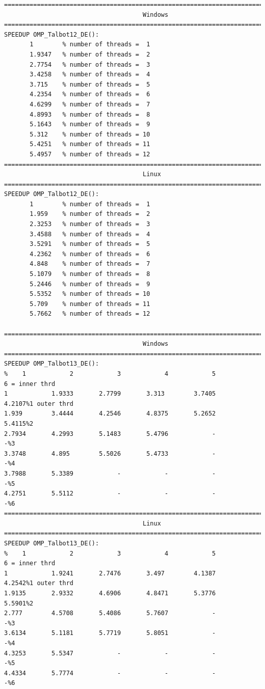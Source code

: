 \documentclass[a4paper,10pt]{report}%
\begin{document}
\begin{lstlisting}
====================================================================================
                                      Windows
====================================================================================
SPEEDUP OMP_Talbot12_DE():
       1        % number of threads =  1
       1.9347   % number of threads =  2
       2.7754   % number of threads =  3
       3.4258   % number of threads =  4
       3.715    % number of threads =  5
       4.2354   % number of threads =  6
       4.6299   % number of threads =  7
       4.8993   % number of threads =  8
       5.1643   % number of threads =  9
       5.312    % number of threads = 10
       5.4251   % number of threads = 11
       5.4957   % number of threads = 12
====================================================================================
                                      Linux
====================================================================================
SPEEDUP OMP_Talbot12_DE():
       1        % number of threads =  1
       1.959    % number of threads =  2
       2.3253   % number of threads =  3
       3.4588   % number of threads =  4
       3.5291   % number of threads =  5
       4.2362   % number of threads =  6
       4.848    % number of threads =  7
       5.1079   % number of threads =  8
       5.2446   % number of threads =  9
       5.5352   % number of threads = 10
       5.709    % number of threads = 11
       5.7662   % number of threads = 12

====================================================================================
                                      Windows
====================================================================================
SPEEDUP OMP_Talbot13_DE():
%    1            2            3            4            5            6 = inner thrd
1            1.9333       2.7799       3.313        3.7405       4.2107%1 outer thrd
1.939        3.4444       4.2546       4.8375       5.2652       5.4115%2
2.7934       4.2993       5.1483       5.4796            -            -%3
3.3748       4.895        5.5026       5.4733            -            -%4
3.7988       5.3389            -            -            -            -%5
4.2751       5.5112            -            -            -            -%6
====================================================================================
                                      Linux
====================================================================================
SPEEDUP OMP_Talbot13_DE():
%    1            2            3            4            5            6 = inner thrd
1            1.9241       2.7476       3.497        4.1387       4.2542%1 outer thrd
1.9135       2.9332       4.6906       4.8471       5.3776       5.5901%2
2.777        4.5708       5.4086       5.7607            -            -%3
3.6134       5.1181       5.7719       5.8051            -            -%4
4.3253       5.5347            -            -            -            -%5
4.4334       5.7774            -            -            -            -%6
\end{lstlisting}
\end{document}
